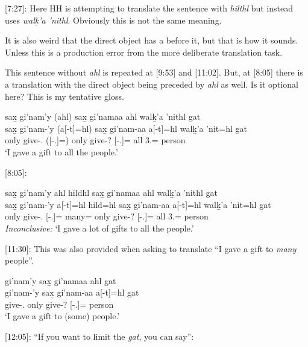 [7:27]: Here HH is attempting to translate the sentence with \textit{hilthl} but instead uses \textit{walḵ'a 'nithl}. Obviously this is not the same meaning.

It is also weird that the direct object has a \Prep{} before it, but that is how it sounds. Unless this is a production error from the more deliberate translation task.

This sentence without \textit{ahl} is repeated at [9:53] and [11:02]. But, at [8:05] there is a translation with the direct object being preceded by \textit{ahl} as well. Is it optional here? This is my tentative gloss.

\begin{exe}
    \ex \glll sax̱ gi'nam'y (ahl) sax̱ gi'namaa ahl walḵ'a 'nithl gat \\
    sax̱ gi'nam-'y (a[-t]=hl) sax̱ gi'nam-aa a[-t]=hl walḵ'a 'nit=hl gat \\
    only give-\Fsg{}.\Ii{} (\Prep{}[-\Ssg{}.\Ii{}]=\Cn{}) only give-\Nmlz{}? \Prep{}[-\Ssg{}.\Ii{}]=\Cn{} all 3.\Iii{}=\Cn{} person \\
    `I gave a gift to all the people.' 
\end{exe}

[8:05]:

\begin{exe}
    \ex \glll sax̱ gi'nam'y ahl hildhl sax̱ gi'namaa ahl walḵ'a 'nithl gat \\
    sax̱ gi'nam-'y a[-t]=hl hild=hl sax̱ gi'nam-aa a[-t]=hl walḵ'a 'nit=hl gat \\
    only give-\Fsg{}.\Ii{} \Prep{}[-\Ssg{}.\Ii{}]=\Cn{} many=\Cn{} only give-\Nmlz{}? \Prep{}[-\Ssg{}.\Ii{}]=\Cn{} all 3.\Iii{}=\Cn{} person \\
    \textit{Inconclusive: }`I gave a lot of gifts to all the people.' 
\end{exe}

[11:30]: This was also provided when asking to translate ``I gave a gift to \textit{many} people''.

\begin{exe}
    \ex \glll gi'nam'y  sax̱ gi'namaa ahl gat \\
    gi'nam-'y  sax̱ gi'nam-aa a[-t]=hl gat \\
    give-\Fsg{}.\Ii{} only give-\Nmlz{}? \Prep{}[-\Ssg{}.\Ii{}]=\Cn{} person \\
    `I gave a gift to (some) people.' 
\end{exe}

[12:05]: ``If you want to limit the \textit{gat}, you can say'': 

